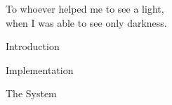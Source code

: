 \documentclass[twoside,english, a4paper, 11pt]{shared/fysbachelor}
\begin{document}







%		
\cleardoublepage
\begin{dedication}
	\null\vfill
	\begin{flushright}
		To whoever helped me to see a light,\\ when I was able to see only darkness.
		\vspace{12pt}
	\end{flushright}
	\null\vfill
\end{dedication}

\clearpage
\cleardoublepage

\begin{abstract}
	
	\clearpage
\end{abstract}


\tableofcontents
\clearpage 

\begin{chapter}{Introduction}
	\label{chap:intro}
	  
\end{chapter}

%


\begin{part}{Implementation}
	\label{part:implementation}
	
	\begin{chapter}{The System}
		\label{chap:system}
		
	\end{chapter}
	
%  		
%
%		
\end{part}
\end{document}
